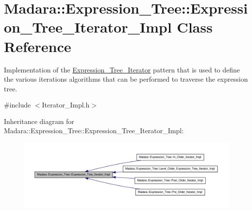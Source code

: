 \hypertarget{classMadara_1_1Expression__Tree_1_1Expression__Tree__Iterator__Impl}{
\section{Madara::Expression\_\-Tree::Expression\_\-Tree\_\-Iterator\_\-Impl Class Reference}
\label{d0/dd7/classMadara_1_1Expression__Tree_1_1Expression__Tree__Iterator__Impl}
}


Implementation of the \hyperlink{classMadara_1_1Expression__Tree_1_1Expression__Tree__Iterator}{Expression\_\-Tree\_\-Iterator} pattern that is used to define the various iterations algorithms that can be performed to traverse the expression tree.  




{\ttfamily \#include $<$Iterator\_\-Impl.h$>$}



Inheritance diagram for Madara::Expression\_\-Tree::Expression\_\-Tree\_\-Iterator\_\-Impl:
\nopagebreak
\begin{figure}[H]
\begin{center}
\leavevmode
\includegraphics[width=400pt]{d5/d51/classMadara_1_1Expression__Tree_1_1Expression__Tree__Iterator__Impl__inherit__graph}
\end{center}
\end{figure}


